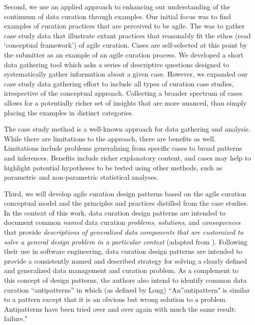 \documentclass[paper]{ijdc-v9}
\begin{document}
Second, we use an applied approach to enhancing our understanding of the
continuum of data curation through examples. Our initial focus was to
find examples of curation practices that are perceived to be agile. The
was to gather case study data that illustrate extant practices that
reasonably fit the ethos (read `conceptual framework') of agile
curation. Cases are self-selected at this point by the submitter as an
example of an agile curation process. We developed a short data
gathering tool which asks a series of descriptive questions designed to
systematically gather information about a given case. However, we
expanded our case study data gathering effort to include all types of
curation case studies, irrespective of the conceptual approach.
Collecting a broader spectrum of cases allows for a potentially richer
set of insights that are more nuanced, than simply placing the examples
in distinct categories.

The case study method is a well-known approach for data gathering and
analysis. While there are limitations to the approach, there are
benefits as well. Limitations include problems generalizing from
specific cases to broad patterns and inferences. Benefits include richer
explanatory content, and cases may help to highlight potential
hypotheses to be tested using other methods, such as parametric and
non-parametric statistical analyses.

Third, we will develop agile curation design patterns based on the agile
curation conceptual model and the principles and practices distilled
from the case studies. In the context of this work, data curation design
patterns are intended to document common \emph{named} data curation
\emph{problems}, \emph{solutions}, and \emph{consequences} that provide
\emph{descriptions of generalized data components that are customized to
solve a general design problem in a particular context} (adapted from
\autocite[section 1.1]{gamma_design_1995}). Following their use in
software engineering, data curation design patterns are intended to
provide a consistently named and described strategy for solving a
clearly defined and generalized data management and curation problem. As
a complement to this concept of design patterns, the authors also intend
to identify common data curation ``antipatterns'' in which (as defined
by Long) ``An''antipattern" is similar to a pattern except that it is an
obvious but wrong solution to a problem. Antipatterns have been tried
over and over again with much the same result: failure." \autocite[pg.
68]{long_software_2001}
\end{document}
